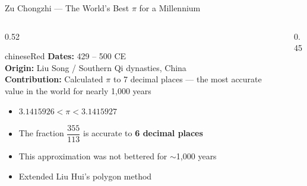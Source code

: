 \begin{frame}[shrink=15]{Zu Chongzhi --- The World's Best $\pi$ for a Millennium}

  \begin{columns}[T]
    \begin{column}{0.52\textwidth}
      \begin{personbox}[Zu Chongzhi]{chineseRed}
        \small
        \textbf{Dates:} 429 -- 500 CE\\
        \textbf{Origin:} Liu Song / Southern Qi dynasties, China\\
        \textbf{Contribution:} Calculated $\pi$ to 7 decimal places ---
        the most accurate value in the world for nearly 1,000 years
      \end{personbox}

      \vspace{0.4em}
      \begin{itemize}
        \item $3.1415926 < \pi < 3.1415927$
        \item The fraction $\dfrac{355}{113}$ is accurate to \textbf{6 decimal places}
        \item This approximation was not bettered for \alert{$\sim$1,000 years}
        \item Extended Liu Hui's polygon method
      \end{itemize}
    \end{column}

    \begin{column}{0.45\textwidth}

      \vspace{0.5em}
    \end{column}
  \end{columns}

\end{frame}

